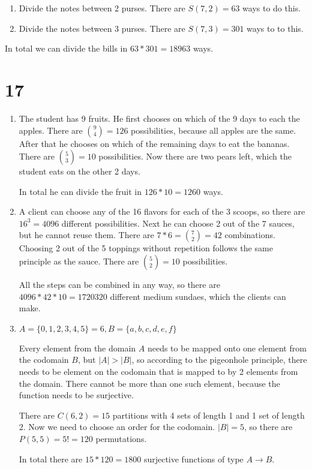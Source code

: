 \documentclass[12pt]{article}
\begin{document}
\begin{enumerate}
	\item
	Divide the notes between 2 purses. There are $S(7, 2) = 63$ ways to do this.
	\item
	Divide the notes between 3 purses. There are $S(7, 3) = 301$ ways to to this.
\end{enumerate}

In total we can divide the bills in $63 * 301 = 18963$ ways.

\section*{17}
\begin{enumerate}[a]
	\item %
	The student has 9 fruits. He first chooses on which of the 9 days to each the apples. There are $\binom{9}{4} = 126$ possibilities, because all apples are the same. After that he chooses on which of the remaining days to eat the bananas. There are $\binom{5}{3} = 10$ possibilities. Now there are two pears left, which the student eats on the other 2 days.

	In total he can divide the fruit in $126 * 10 = 1260$ ways.
	\item %
	A client can choose any of the 16 flavors for each of the 3 scoops, so there are $16^3 = 4096$ different possibilities. Next he can choose 2 out of the 7 sauces, but he cannot reuse them. There are $7 * 6 = \binom{7}{2} = 42$ combinations. Choosing 2 out of the 5 toppings without repetition follows the same principle as the sauce. There are $\binom{5}{2} = 10$ possibilities.

	All the steps can be combined in any way, so there are $4096 * 42 * 10 = 1720320$ different medium sundaes, which the clients can make.
	\item %
	$A = \{0, 1, 2, 3, 4, 5\} = 6, B = \{a, b, c, d, e, f\}$

	Every element from the domain $A$ needs to be mapped onto one element from the codomain $B$, but $|A| > |B|$, so according to the pigeonhole principle, there needs to be element on the codomain that is mapped to by 2 elements from the domain. There cannot be more than one such element, because the function needs to be surjective.

	There are $C(6, 2) = 15$ partitions with 4 sets of length 1 and 1 set of length 2. Now we need to choose an order for the codomain. $|B| = 5$, so there are $P(5, 5) = 5! = 120$ permutations.

	In total there are $15 * 120 = 1800$ surjective functions of type $A \rightarrow B$.
\end{enumerate}
\end{document}

